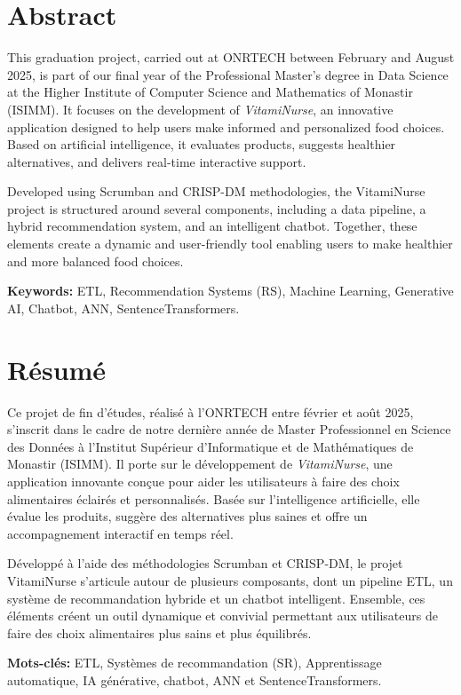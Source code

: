 \chapter*{Abstract}

This graduation project, carried out at ONRTECH between February and August 2025, is part of our final year of the Professional Master’s degree in Data Science at the Higher Institute of Computer Science and Mathematics of Monastir (ISIMM). It focuses on the development of \textit{VitamiNurse}, an innovative application designed to help users make informed and personalized food choices. Based on artificial intelligence, it evaluates products, suggests healthier alternatives, and delivers real-time interactive support.

Developed using Scrumban and CRISP-DM methodologies, the VitamiNurse project is structured around several components, including a data pipeline, a hybrid recommendation system, and an intelligent chatbot. Together, these elements create a dynamic and user-friendly tool enabling users to make healthier and more balanced food choices.

\noindent\textbf{Keywords:} ETL, Recommendation Systems (RS), Machine Learning, Generative AI, Chatbot, ANN, SentenceTransformers.

\newpage
\chapter*{Résumé}
Ce projet de fin d’études, réalisé à l’ONRTECH entre février et août 2025, s’inscrit dans le cadre de notre dernière année de Master Professionnel en Science des Données à l’Institut Supérieur d’Informatique et de Mathématiques de Monastir (ISIMM). Il porte sur le développement de \textit{VitamiNurse}, une application innovante conçue pour aider les utilisateurs à faire des choix alimentaires éclairés et personnalisés. Basée sur l’intelligence artificielle, elle évalue les produits, suggère des alternatives plus saines et offre un accompagnement interactif en temps réel.

Développé à l’aide des méthodologies Scrumban et CRISP-DM, le projet VitamiNurse s’articule autour de plusieurs composants, dont un pipeline ETL, un système de recommandation hybride et un chatbot intelligent. Ensemble, ces éléments créent un outil dynamique et convivial permettant aux utilisateurs de faire des choix alimentaires plus sains et plus équilibrés.

\noindent\textbf{Mots-clés:} ETL, Systèmes de recommandation (SR), Apprentissage automatique, IA générative, chatbot, ANN et SentenceTransformers.